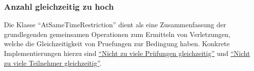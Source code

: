 \subsubsection{Anzahl gleichzeitig zu hoch}\label{subsubsec:anzahl-gleichzeitig-zu-hoch}
Die Klasse \enquote{AtSameTimeRestriction} dient als eine Zusammenfassung der grundlegenden
gemeinsamen Operationen zum Ermitteln von Verletzungen, welche die Gleichzeitigkeit von Pruefungen
zur Bedingung haben.
Konkrete Implementierungen hierzu sind
\hyperref[subsubsec:nicht-zu-viele-pruefungen-gleichzeitig]{\enquote{Nicht zu viele Prüfungen gleichzeitig}}
und
\hyperref[subsubsec:nicht-zu-viele-teilnehmer-gleichzeitig]{\enquote{Nicht zu viele Teilnehmer gleichzeitig}}.
